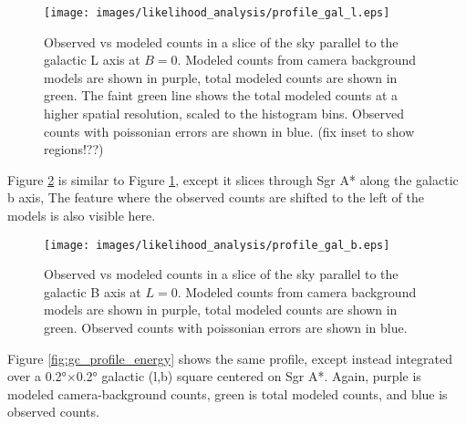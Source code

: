   \begin{figure}[h]
    \centering
    \texttt{[image: images/likelihood\_analysis/profile\_gal\_l.eps]}
    \caption[Galactic Center Profile vs Galactic L]{
      Observed vs modeled counts in a slice of the sky parallel to the galactic L axis at $B=0$.
      Modeled counts from camera background models are shown in purple, total modeled counts are shown in green.
      The faint green line shows the total modeled counts at a higher spatial resolution, scaled to the histogram bins.
      Observed counts with poissonian errors are shown in blue.
      {\color{red}(fix inset to show regions!??)}
    }
    \label{fig:gc_profile_gal_l}
  \end{figure}

  Figure \ref{fig:gc_profile_gal_b} is similar to Figure \ref{fig:gc_profile_gal_l}, except it slices through Sgr A* along the galactic b axis,
  The feature where the observed counts are shifted to the left of the models is also visible here.

  \begin{figure}[h]
    \centering
    \texttt{[image: images/likelihood\_analysis/profile\_gal\_b.eps]}
    \caption[Galactic Center Profile vs Galactic B]{
      Observed vs modeled counts in a slice of the sky parallel to the galactic B axis at $L=0$.
      Modeled counts from camera background models are shown in purple, total modeled counts are shown in green.
      Observed counts with poissonian errors are shown in blue.
    }
    \label{fig:gc_profile_gal_b}
  \end{figure}

  Figure \ref{fig:gc_profile_energy} shows the same profile, except instead integrated over a \ang{0.2}$\times$\ang{0.2} galactic (l,b) square centered on Sgr A*.
  Again, purple is modeled camera-background counts, green is total modeled counts, and blue is observed counts.
  

